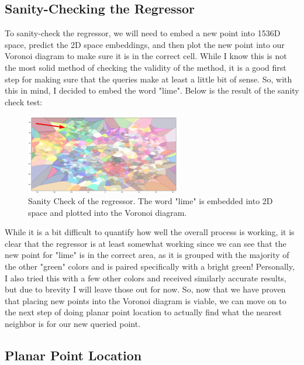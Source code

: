 \documentclass{article}
\begin{document}
\subsection{Sanity-Checking the Regressor}
To sanity-check the regressor, we will need to embed a new point into 1536D space,
predict the 2D space embeddings, and then plot the new point into our Voronoi diagram
to make sure it is in the correct cell. While I know this is not the most solid
method of checking the validity of the method, it is a good first step for making
sure that the queries make at least a little bit of sense. So, with this in mind,
I decided to embed the word "lime". Below is the result of the sanity check test:

\begin{figure}[H]
\centering
\includegraphics[width=0.6\textwidth]{images/query_sanity_check.png}
\caption{Sanity Check of the regressor. The word "lime" is embedded into 2D space and plotted into the Voronoi diagram.}
\label{fig:sanitycheck}
\end{figure}

\noindent
While it is a bit difficult to quantify how well the overall process is
working, it is clear that the regressor is at least somewhat working since
we can see that the new point for "lime" is in the correct area, as it is 
grouped with the majority of the other "green" colors and is paired 
specifically with a bright green! Personally, I also tried this with a few
other colors and received similarly accurate results, but due to brevity
I will leave those out for now. So, now that we have proven that placing 
new points into the Voronoi diagram is viable, we can move on to the next
step of doing planar point location to actually find what the nearest 
neighbor is for our new queried point.

\subsection{Planar Point Location}

\newpage
{}


\end{document}
